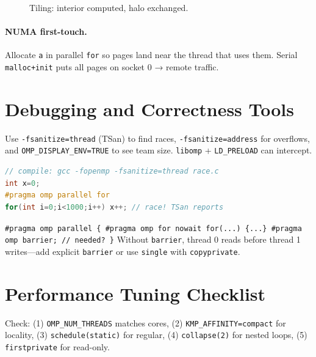 \begin{figure}[h]\centering
{}
\caption{Tiling: interior computed, halo exchanged.}
\label{fig:stencil}
\end{figure}

\paragraph{NUMA first-touch.} Allocate \texttt{a} in parallel \texttt{for} so pages land near the thread that uses them. Serial \texttt{malloc+init} puts all pages on socket 0 → remote traffic.



\section{Debugging and Correctness Tools}\label{sec:debug-omp}
Use \texttt{-fsanitize=thread} (TSan) to find races, \texttt{-fsanitize=address} for overflows, and \texttt{OMP\_DISPLAY\_ENV=TRUE} to see team size. \texttt{libomp} + \texttt{LD\_PRELOAD} can intercept.

\begin{lstlisting}[language=C,caption={TSan finds the race.}]
// compile: gcc -fopenmp -fsanitize=thread race.c
int x=0;
#pragma omp parallel for
for(int i=0;i<1000;i++) x++; // race! TSan reports
\end{lstlisting}

\begin{example} \texttt{\#pragma omp parallel \{ \#pragma omp for nowait for(...) \{...\} \#pragma omp barrier; // needed? \}} Without \texttt{barrier}, thread 0 reads before thread 1 writes—add explicit \texttt{barrier} or use \texttt{single} with \texttt{copyprivate}.
\end{example}

\section{Performance Tuning Checklist}\label{sec:tune-omp}
Check: (1) \texttt{OMP\_NUM\_THREADS} matches cores, (2) \texttt{KMP\_AFFINITY=compact} for locality, (3) \texttt{schedule(static)} for regular, (4) \texttt{collapse(2)} for nested loops, (5) \texttt{firstprivate} for read-only.

